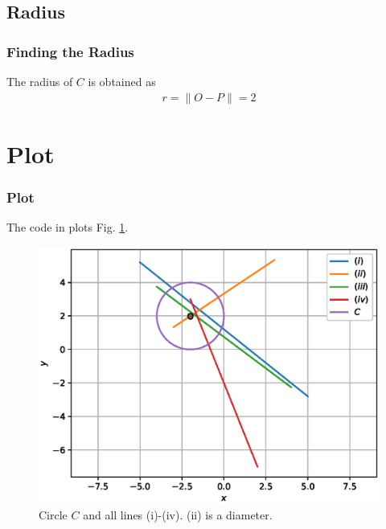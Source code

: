 \documentclass{beamer}
\theoremstyle{remark}
\providecommand{\norm}[1]{\lVert#1\rVert}
\begin{document}
\subsection{Radius}
\begin{frame}
\frametitle{Finding the Radius}
The radius  of $C$ is obtained as
\begin{align}
r = \norm{O-P} = 2
\end{align}
\end{frame}
\section{Plot}
\begin{frame}
\frametitle{Plot}
The code in 
plots Fig. \ref{fig:circle_diameter}.
%
\begin{figure}
\centering
\includegraphics[width=0.75\columnwidth]{./figs/circle_diameter.eps}
\caption{Circle $C$ and all lines (i)-(iv). (ii) is a diameter.}
\label{fig:circle_diameter}
\end{figure}
\end{frame}
%
%  
%
%
\end{document}
